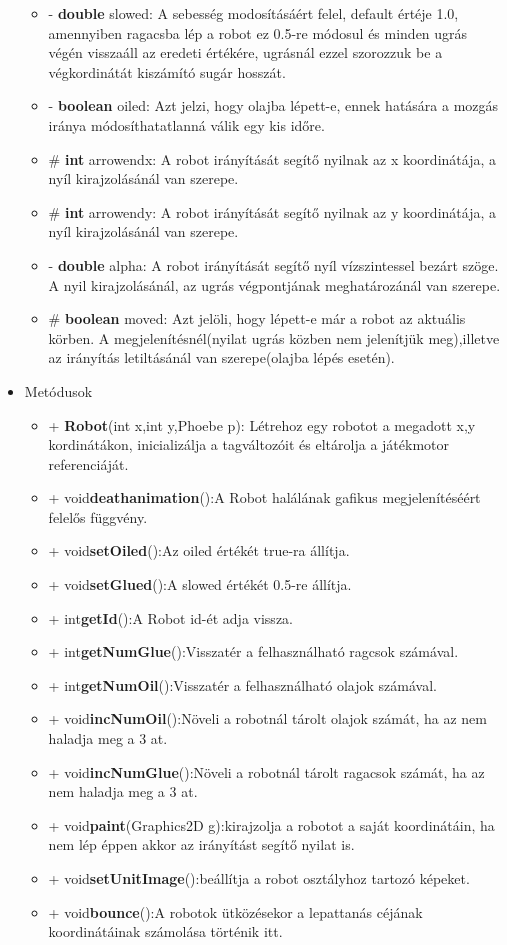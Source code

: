 \begin{itemize}
\begin{itemize}
		\item- \textbf{double} slowed: A sebesség modosításáért felel, default értéje 1.0, amennyiben ragacsba lép a robot ez 0.5-re módosul és minden ugrás végén visszaáll az eredeti értékére, ugrásnál ezzel szorozzuk be a végkordinátát kiszámító sugár hosszát.
		\item- \textbf{boolean} oiled: Azt jelzi, hogy olajba lépett-e, ennek hatására a mozgás iránya módosíthatatlanná válik egy kis időre. 
		\item\# \textbf{int} arrowendx: A robot irányítását segítő nyilnak az x koordinátája, a nyíl kirajzolásánál van szerepe.
		\item\# \textbf{int} arrowendy: A robot irányítását segítő nyilnak az y koordinátája, a nyíl kirajzolásánál van szerepe.
		\item- \textbf{double} alpha: A robot irányítását segítő nyíl vízszintessel bezárt szöge. A nyil kirajzolásánál, az ugrás végpontjának meghatározánál van szerepe.
		\item\# \textbf{boolean} moved: Azt jelöli, hogy lépett-e már a robot az aktuális körben. A megjelenítésnél(nyilat ugrás közben nem jelenítjük meg),illetve az irányítás letiltásánál van szerepe(olajba lépés esetén).
	
\end{itemize}
\item Metódusok\\
	\begin{itemize}
		\item+ \textbf{Robot}(int x,int y,Phoebe p): Létrehoz egy robotot a megadott x,y kordinátákon, inicializálja a tagváltozóit és eltárolja a játékmotor referenciáját.
		\item+ void\textbf{deathanimation}():A Robot halálának gafikus megjelenítéséért felelős függvény.
		\item+ void\textbf{setOiled}():Az oiled értékét true-ra állítja. 
		\item+ void\textbf{setGlued}():A slowed értékét 0.5-re állítja. 
		\item+ int\textbf{getId}():A Robot id-ét adja vissza.
		\item+ int\textbf{getNumGlue}():Visszatér a felhasználható ragcsok számával.
		\item+ int\textbf{getNumOil}():Visszatér a felhasználható olajok számával.
		\item+ void\textbf{incNumOil}():Növeli a robotnál tárolt olajok számát, ha az nem haladja meg a 3 at.
		\item+ void\textbf{incNumGlue}():Növeli a robotnál tárolt ragacsok számát, ha az nem haladja meg a 3 at.
	\item+ void\textbf{paint}(Graphics2D g):kirajzolja a robotot a saját koordinátáin, ha nem lép éppen akkor az irányítást segítő nyilat is.
	\item+ void\textbf{setUnitImage}():beállítja a robot osztályhoz tartozó képeket.
\item+ void\textbf{bounce}():A robotok ütközésekor a lepattanás céjának  koordinátáinak számolása történik itt.


\end{itemize}
\end{itemize}
